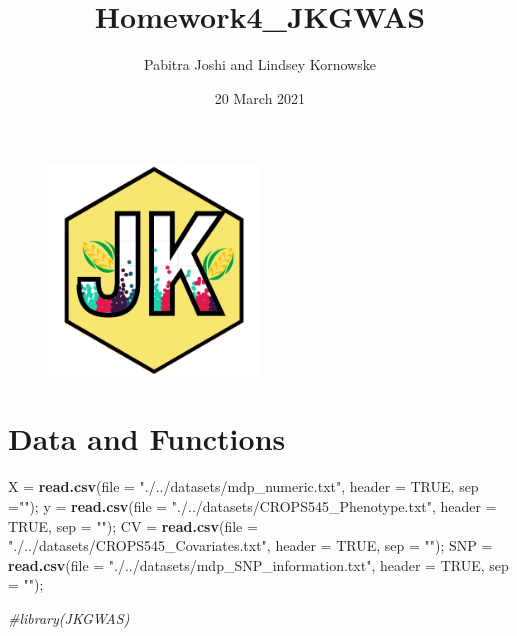 \documentclass[
]{article}
\title{Homework4\_JKGWAS}
\author{Pabitra Joshi and Lindsey Kornowske}
\date{20 March 2021}
\newenvironment{Shaded}{\begin{snugshade}}{\end{snugshade}}
\newcommand{\CommentTok}[1]{\textcolor[rgb]{0.56,0.35,0.01}{\textit{#1}}}
\newcommand{\DataTypeTok}[1]{\textcolor[rgb]{0.13,0.29,0.53}{#1}}
\newcommand{\KeywordTok}[1]{\textcolor[rgb]{0.13,0.29,0.53}{\textbf{#1}}}
\newcommand{\NormalTok}[1]{#1}
\newcommand{\OtherTok}[1]{\textcolor[rgb]{0.56,0.35,0.01}{#1}}
\newcommand{\StringTok}[1]{\textcolor[rgb]{0.31,0.60,0.02}{#1}}
\begin{document}
\maketitle

{
\setcounter{tocdepth}{6}
\tableofcontents
}
\begin{figure}[htbp]
\begin{center}
\includegraphics[width = 0.5\textwidth]{JKGWAS_logo.png}
\end{center}
\end{figure}

\hypertarget{data-and-functions}{%
\section{Data and Functions}\label{data-and-functions}}

\begin{Shaded}
\begin{Highlighting}[]
\NormalTok{X =}\StringTok{ }\KeywordTok{read.csv}\NormalTok{(}\DataTypeTok{file =} \StringTok{"./../datasets/mdp\_numeric.txt"}\NormalTok{, }\DataTypeTok{header =} \OtherTok{TRUE}\NormalTok{, }\DataTypeTok{sep =}\StringTok{""}\NormalTok{);}
\NormalTok{y =}\StringTok{ }\KeywordTok{read.csv}\NormalTok{(}\DataTypeTok{file =} \StringTok{"./../datasets/CROPS545\_Phenotype.txt"}\NormalTok{, }\DataTypeTok{header =} \OtherTok{TRUE}\NormalTok{, }\DataTypeTok{sep =} \StringTok{""}\NormalTok{);}
\NormalTok{CV =}\StringTok{ }\KeywordTok{read.csv}\NormalTok{(}\DataTypeTok{file =} \StringTok{"./../datasets/CROPS545\_Covariates.txt"}\NormalTok{, }\DataTypeTok{header =} \OtherTok{TRUE}\NormalTok{, }\DataTypeTok{sep =} \StringTok{""}\NormalTok{);}
\NormalTok{SNP =}\StringTok{ }\KeywordTok{read.csv}\NormalTok{(}\DataTypeTok{file =} \StringTok{"./../datasets/mdp\_SNP\_information.txt"}\NormalTok{, }\DataTypeTok{header =} \OtherTok{TRUE}\NormalTok{, }\DataTypeTok{sep =} \StringTok{""}\NormalTok{);}

\CommentTok{\#library(JKGWAS)}
\end{Highlighting}
\end{Shaded}
\end{document}
